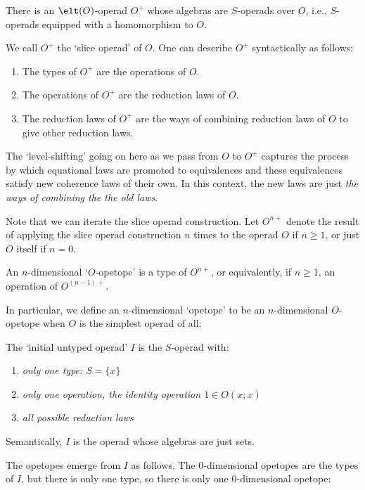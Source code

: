 \begin{thm}\et There is an $\elt(O)$-operad $O^+$ whose algebras are
$S$-operads over $O$, i.e., $S$-operads equipped with a homomorphism to
$O$.  \end{thm}

\noindent We call $O^+$ the `slice operad' of $O$.  One can describe 
$O^+$ syntactically as follows:
\begin{enumerate}
\item The types of $O^+$ are the operations of $O$.
\item The operations of $O^+$ are the reduction laws of $O$.
\item The reduction laws of $O^+$ are the ways of combining reduction
laws of $O$ to give other reduction laws.
\end{enumerate}
The `level-shifting' going on here as we pass from $O$ to $O^+$
captures the process by which equational laws are promoted to equivalences and 
these equivalences satisfy new coherence laws of their own.  In this
context, the new laws are just {\it the ways of combining the the old laws}.

Note that we can iterate the slice operad construction. 
Let $O^{n+}$ denote the result of applying the slice operad construction
$n$ times to the operad $O$ if $n \ge 1$, or just $O$ itself if $n = 0$.

\begin{defn}\et An $n$-dimensional `$O$-opetope' is a type of $O^{n+}$,
or equivalently, if $n \ge 1$, an operation of $O^{(n-1)+}$.  \end{defn}

\noindent In particular, we define an $n$-dimensional `opetope' to be an
$n$-dimensional $O$-opetope when $O$ is the simplest operad of all:

\begin{defn}\et The `initial untyped operad' $I$ is the $S$-operad with:
{\rm \begin{enumerate}
\item {\it only one type: $S = \{x\}$}
\item {\it only one operation, the identity operation $1 \in O(x;x)$}
\item {\it all possible reduction laws}
\end{enumerate}
}
\end{defn}

\noindent Semantically, $I$ is the operad whose algebras are just sets.

The opetopes emerge from $I$ as follows.  The 0-dimensional opetopes
are the types of $I$, but there is only one type, so there is only
one 0-dimensional opetope:


